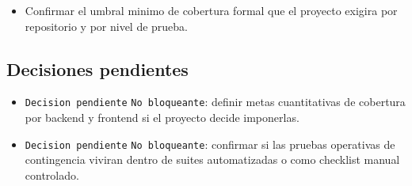 \begin{itemize}
  \item Confirmar el umbral minimo de cobertura formal que el proyecto exigira por repositorio y por nivel de prueba.
\end{itemize}

\subsection{Decisiones pendientes}

\begin{itemize}
  \item \texttt{Decision pendiente} \texttt{No bloqueante}: definir metas cuantitativas de cobertura por backend y frontend si el proyecto decide imponerlas.
  \item \texttt{Decision pendiente} \texttt{No bloqueante}: confirmar si las pruebas operativas de contingencia viviran dentro de suites automatizadas o como checklist manual controlado.
\end{itemize}
